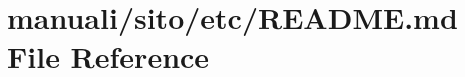 \hypertarget{manuali_2sito_2etc_2README_8md}{}\section{manuali/sito/etc/\+R\+E\+A\+D\+ME.md File Reference}
\label{manuali_2sito_2etc_2README_8md}
